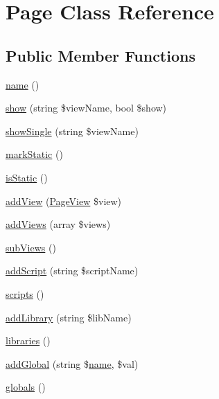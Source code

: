 \hypertarget{class_lora_1_1_page}{}\section{Page Class Reference}
\label{class_lora_1_1_page}
\subsection*{Public Member Functions}
\begin{DoxyCompactItemize}
\item 
\hyperlink{class_lora_1_1_page_a4b516aaa5fa38da4fed24ab6001627e2}{name} ()
\item 
\hyperlink{class_lora_1_1_page_a4bf70b1d635601a513ff8f2c31a9111a}{show} (string \$view\+Name, bool \$show)
\item 
\hyperlink{class_lora_1_1_page_a3aa8e55512ba551535b423e88ec4c9b1}{show\+Single} (string \$view\+Name)
\item 
\hyperlink{class_lora_1_1_page_ad9b0a8a1b47c6bfbacd35cb4570d408a}{mark\+Static} ()
\item 
\hyperlink{class_lora_1_1_page_a9b2dd808ffcd764782fb11b3ea583a8d}{is\+Static} ()
\item 
\hyperlink{class_lora_1_1_page_a56b08acddd9971d439900b307e91f1f0}{add\+View} (\hyperlink{class_lora_1_1_page_view}{Page\+View} \$view)
\item 
\hyperlink{class_lora_1_1_page_a3af53cb9d6437cde1e23d590488e683a}{add\+Views} (array \$views)
\item 
\hyperlink{class_lora_1_1_page_a420c4b91157962374150f731a2ac57dc}{sub\+Views} ()
\item 
\hyperlink{class_lora_1_1_page_a7fe61d61fcc6f2fd15c5ac37d43299c8}{add\+Script} (string \$script\+Name)
\item 
\hyperlink{class_lora_1_1_page_a3dc593f496b7dbf2e5e3c406cb5fd106}{scripts} ()
\item 
\hyperlink{class_lora_1_1_page_a0142622c98f897c6345547516325c876}{add\+Library} (string \$lib\+Name)
\item 
\hyperlink{class_lora_1_1_page_af34d5049c9cc4ab108d65218754b7429}{libraries} ()
\item 
\hyperlink{class_lora_1_1_page_a7fab10802dd45ee18ac432c3ad597eb5}{add\+Global} (string \$\hyperlink{class_lora_1_1_page_a4b516aaa5fa38da4fed24ab6001627e2}{name}, \$val)
\item 
\hyperlink{class_lora_1_1_page_aebdf4663cb6825d8f47de13850be31bd}{globals} ()
\item 

\end{DoxyCompactItemize}
